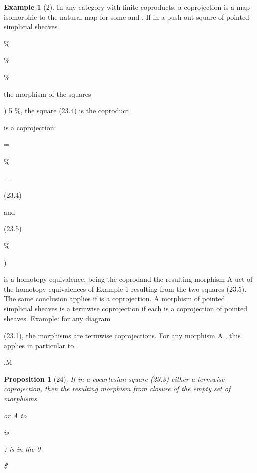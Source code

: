 \documentclass[11pt,a4paper]{article}
\theoremstyle{plain}
\newtheorem{proposition}[theorem]{Proposition}
\theoremstyle{definition}
\newtheorem{example}[theorem]{Example}
\begin{document}
\begin{example}[2]
In any category with finite coproducts, a coprojection is a map isomorphic to the natural map
for some and . If in a push-out square of
pointed simplicial sheaves

\%

\%

\%



  


the morphism
of the squares

 )
5 \%, the square (23.4) is the coproduct

 is a coprojection:




=


  \%




=


(23.4)

and







(23.5)

  \%

)

is a homotopy equivalence, being the coprodand the resulting morphism A
uct of the homotopy equivalences of Example 1 resulting from the two squares
(23.5). The same conclusion applies if
is a coprojection.
A morphism of pointed simplicial sheaves
is a termwise coprojection
if each 
is
a
coprojection
of
pointed
sheaves.
Example: for any diagram

(23.1), the morphisms
are
termwise
coprojections.
For any morphism
A
, this applies in particular to
.







.M 

\end{example}

\begin{proposition}[24]
If in a cocartesian square (23.3) either
a termwise coprojection, then the resulting morphism from
closure of the empty set of morphisms.

or
A to

is

) is in the 0-

\$

\end{proposition}
\end{document}
